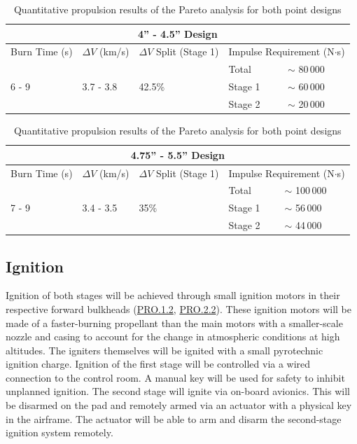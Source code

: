 \begin{table}
    \centering

    \begin{tabularx}{0.9\textwidth}{|p{2.5cm}|p{2cm}|p{3cm}|X|X|}
        \hline
        \multicolumn{5}{|c|}{\textbf{4'' - 4.5'' Design}} \\ \hline
        Burn Time (s) & \(\Delta V\) (km/s) & \(\Delta V\) Split (Stage 1) & \multicolumn{2}{|l|}{Impulse Requirement (N\(\cdot\)s)} \\ \hline
        \multirow{3}{*}{6 - 9} & \multirow{3}{*}{3.7 - 3.8} & \multirow{3}{*}{42.5\%} & Total & \(\sim\) 80\(\,\)000 \\ \cline{4-5}
        & & & Stage 1 & \(\sim\) 60\,000 \\ \cline{4-5}
        & & & Stage 2 & \(\sim\) 20\,000 \\ \hline        
    \end{tabularx}

    \vspace{0.75cm}

    \begin{tabularx}{0.9\textwidth}{|p{2.5cm}|p{2cm}|p{3cm}|X|X|}
        \hline
        \multicolumn{5}{|c|}{\textbf{4.75'' - 5.5'' Design}} \\ \hline
        Burn Time (s) & \(\Delta V\) (km/s) & \(\Delta V\) Split (Stage 1) & \multicolumn{2}{|l|}{Impulse Requirement (N\(\cdot\)s)} \\ \hline
        \multirow{3}{*}{7 - 9} & \multirow{3}{*}{3.4 - 3.5} & \multirow{3}{*}{35\%} & Total & \(\sim\) 100\(\,\)000 \\ \cline{4-5}
        & & & Stage 1 & \(\sim\) 56\,000 \\ \cline{4-5}
        & & & Stage 2 & \(\sim\) 44\,000 \\ \hline        
    \end{tabularx}

    \caption{Quantitative propulsion results of the Pareto analysis for both point designs}
    \label{table:prop-pareto-results}
\end{table}


\subsection{Ignition}
Ignition of both stages will be achieved through small ignition motors in their respective forward bulkheads (\hyperlink{PRO.1.2}{PRO.1.2}, \hyperlink{PRO.2.2}{PRO.2.2}). These ignition motors will be made of a faster-burning propellant than the main motors with a smaller-scale nozzle and casing to account for the change in atmospheric conditions at high altitudes. The igniters themselves will be ignited with a small pyrotechnic ignition charge.  Ignition of the first stage will be controlled via a wired connection to the control room. A manual key will be used for safety to inhibit unplanned ignition. The second stage will ignite via on-board avionics. This will be disarmed on the pad and remotely armed via an actuator with a physical key in the airframe. The actuator will be able to arm and disarm the second-stage ignition system remotely. 

